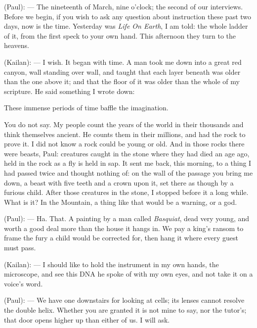 
\begin{room}

(Paul): --- The nineteenth of March, nine o'clock; the second of our interviews. Before we begin, if you wish to ask any question about instruction these past two days, now is the time. Yesterday was \textit{Life On Earth}, I am told: the whole ladder of it, from the first speck to your own hand. This afternoon they turn to the heavens.

(Kailan): --- I wish. It began with time. A man took me down into a great red canyon, wall standing over wall, and taught that each layer beneath was older than the one above it; and that the floor of it was older than the whole of my scripture. He said something I wrote down:

\begin{scripture}
These immense periods of time baffle the imagination.
\end{scripture}

You do not say. My people count the years of the world in their thousands and think themselves ancient. He counts them in their millions, and had the rock to prove it. I did not know a rock could be young or old. And in those rocks there were beasts, Paul: creatures caught in the stone where they had died an age ago, held in the rock as a fly is held in sap. It sent me back, this morning, to a thing I had passed twice and thought nothing of: on the wall of the passage you bring me down, a beast with five teeth and a crown upon it, set there as though by a furious child. After those creatures in the stone, I stopped before it a long while. What is it? In the Mountain, a thing like that would be a warning, or a god.

(Paul): --- Ha. That. A painting by a man called \textit{Basquiat}, dead very young, and worth a good deal more than the house it hangs in. We pay a king's ransom to frame the fury a child would be corrected for, then hang it where every guest must pass.

(Kailan): --- I should like to hold the instrument in my own hands, the microscope, and see this DNA he spoke of with my own eyes, and not take it on a voice's word.

(Paul): --- We have one downstairs for looking at cells; its lenses cannot resolve the double helix. Whether you are granted it is not mine to say, nor the tutor's; that door opens higher up than either of us. I will ask.


\end{room}

